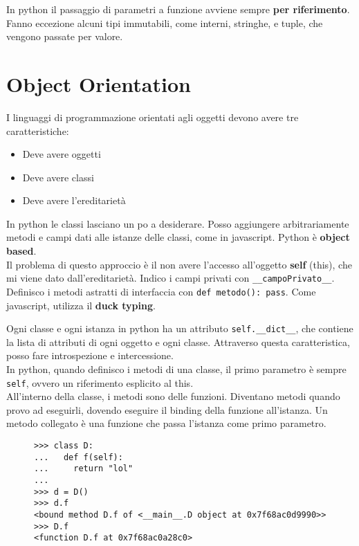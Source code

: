 \documentclass[a4paper,12pt]{article}
\begin{document}
In python il passaggio di parametri a funzione avviene sempre \textbf{per riferimento}. Fanno eccezione alcuni tipi immutabili, come interni, stringhe, e tuple, che vengono passate per valore.

\section{Object Orientation}
I linguaggi di programmazione orientati agli oggetti devono avere tre caratteristiche:
\begin{itemize}
\item Deve avere oggetti
\item Deve avere classi
\item Deve avere l'ereditarietà
\end{itemize}
In python le classi lasciano un po a desiderare. Posso aggiungere arbitrariamente metodi e campi dati alle istanze delle classi, come in javascript. Python è \textbf{object based}.\\
Il problema di questo approccio è il non avere l'accesso all'oggetto \textbf{self} (this), che mi viene dato dall'ereditarietà.
Indico i campi privati con \texttt{\_\_campoPrivato\_\_}. Definisco i metodi astratti di interfaccia con \texttt{def metodo(): pass}. Come javascript, utilizza il \textbf{duck typing}.


Ogni classe e ogni istanza in python ha un attributo \texttt{self.\_\_dict\_\_}, che contiene la lista di attributi di ogni oggetto e ogni classe. Attraverso questa caratteristica, posso fare introspezione e intercessione.\\
In python, quando definisco i metodi di una classe, il primo parametro è sempre \texttt{self}, ovvero un riferimento esplicito al this.\\
All'interno della classe, i metodi sono delle funzioni. Diventano metodi quando provo ad eseguirli, dovendo eseguire il binding della funzione all'istanza. Un metodo collegato è una funzione che passa l'istanza come primo parametro.

\begin{figure}[H]
\begin{lstlisting}
>>> class D:
...   def f(self):
...     return "lol"
... 
>>> d = D()
>>> d.f
<bound method D.f of <__main__.D object at 0x7f68ac0d9990>>
>>> D.f
<function D.f at 0x7f68ac0a28c0>
\end{lstlisting}
\end{figure}
\end{document}
